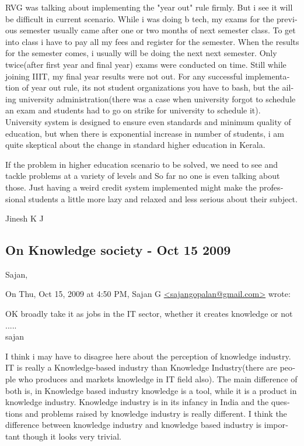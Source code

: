 \begin{english}
RVG was talking about implementing the "year out" rule firmly. But i see it will be difficult in current scenario. While i was doing b tech, my exams for the previous semester usually came after one or two months of next semester class. To get into class i have to pay all my fees and register for the semester. When the results for the semester comes, i usually will be doing the next next semester. Only twice(after first year and final year) exams were conducted on time. Still while joining IIIT, my final year results were not out. For any successful implementation of year out rule, its not student organizations you have to bash, but the ailing university administration(there was a case when university forgot to schedule an exam and students had to go on strike for university to schedule it). University system is designed to ensure even standards and minimum quality of education, but when there is exponential increase in number of students, i am quite skeptical about the change in standard higher education in Kerala.

If the problem in higher education scenario to be solved, we need to see and tackle problems at a variety of levels and So far no one is even talking about those. Just having a weird credit system implemented might make the professional students a little more lazy and relaxed and less serious about their subject.

Jinesh K J


\subsection*{On Knowledge society - Oct 15 2009}
Sajan,

On Thu, Oct 15, 2009 at 4:50 PM, Sajan G \url{<sajangopalan@gmail.com>} wrote:

    OK broadly take it as jobs in the IT sector, whether it creates knowledge or not .....\\
    sajan

I think i may have to disagree here about the perception of knowledge industry. IT is really a Knowledge-based industry than Knowledge Industry(there are people who produces and markets knowledge in IT field also). The main difference of both is, in Knowledge based industry knowledge is a tool, while it is a product in knowledge industry. Knowledge industry is in its infancy in India and the questions and problems raised by knowledge industry is really different. I think the difference between knowledge industry and knowledge based industry is important though it looks very trivial.


\end{english}
